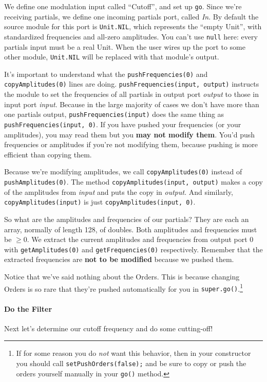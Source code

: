 \documentclass{article}
\begin{document}
We define one modulation input called ``Cutoff'', and set up {\tt go}.   Since we're receiving partials, we define one incoming partials port, called {\it In}.  By default the source module for this port is {\tt Unit.NIL}, which represents the ``empty Unit'', with standardized frequencies and all-zero amplitudes.    You can't use {\tt null} here: every partials input must be a real Unit.  When the user wires up the port to some other module, {\tt Unit.NIL} will be replaced with that module's output.

It's important to understand what the {\tt pushFrequencies(0)} and {\tt copyAmplitudes(0)} lines are doing.  {\tt pushFrequencies(input, output)} instructs the module to set the frequencies of all partials in output port {\it output} to those in input port {\it input}.  Because in the large majority of cases we don't have more than one partials output,   {\tt pushFrequencies(input)} does the same thing as  {\tt pushFrequencies(input, 0)}.  If you have pushed your frequencies (or your amplitudes), you may read them but you {\bf may not modify them}.  You'd push frequencies or amplitudes if you're not modifying them, because pushing is more efficient than copying them.

Because we're modifying amplitudes, we call {\tt copyAmplitudes(0)} instead of {\tt pushAmplitudes(0)}.  The method {\tt copyAmplitudes(input, output)} makes a copy of the amplitudes from {\it input} and puts the copy in {\it output}.  And similarly, {\tt copyAmplitudes(input)} is just {\tt copyAmplitudes(input, 0)}.

So what are the amplitudes and frequencies of our partials? They are each an array, normally of length 128, of doubles.  Both amplitudes and frequencies must be \(\geq 0\).  We extract the current amplitudes and frequencies from output port 0 with {\tt getAmplitudes(0)} and {\tt getFrequencies(0)} respectively.  Remember that the extracted frequencies are {\bf not to be modified} because we pushed them.

Notice that we've said nothing about the Orders.  This is because changing Orders is so rare that they're pushed automatically for you in {\tt super.go()}.\footnote{If for some reason you do {\it not} want this behavior, then in your constructor you should call {\tt setPushOrders(false);} and be sure to copy or push the orders yourself manually in your {\tt go()} method.}

\paragraph{Do the Filter} 
Next let's determine our cutoff frequency and do some cutting-off!
\end{document}
